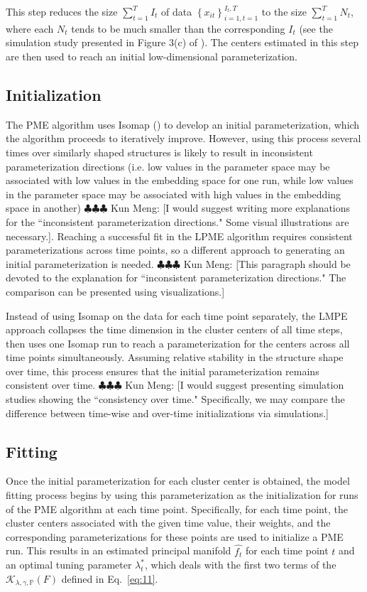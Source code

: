 \documentclass[11pt,reqno]{article}
\newcommand{\meng}[1]{{\color{purple} \sf $\clubsuit\clubsuit\clubsuit$ Kun Meng: [#1]}}
\theoremstyle{definition}
\begin{document}
This step reduces the size $\sum_{t=1}^T I_t$ of data $\left\{x_{it}\right\}_{i=1, t=1}^{I_t, T}$ to the size $\sum_{t=1}^T N_t$, where each $N_t$ tends to be much smaller than the corresponding $I_t$ (see the simulation study presented in Figure 3(c) of \cite{mengPrincipalManifoldEstimation2021}). The centers estimated in this step are then used to reach an initial low-dimensional parameterization.

\subsection*{Initialization}
The PME algorithm uses Isomap (\cite{tenenbaumGlobalGeometricFramework2000}) to develop an initial parameterization, which the algorithm proceeds to iteratively improve. However, using this process several times over similarly shaped structures is likely to result in inconsistent parameterization directions (i.e. low values in the parameter space may be associated with low values in the embedding space for one run, while low values in the parameter space may be associated with high values in the embedding space in another) \meng{I would suggest writing more explanations for the ``inconsistent parameterization directions." Some visual illustrations are necessary.}. Reaching a successful fit in the LPME algorithm requires consistent parameterizations across time points, so a different approach to generating an initial parameterization is needed. \meng{This paragraph should be devoted to the explanation for ``inconsistent parameterization directions." The comparison can be presented using visualizations.}

Instead of using Isomap on the data for each time point separately, the LMPE approach collapses the time dimension in the cluster centers of all time steps, then uses one Isomap run to reach a parameterization for the centers across all time points simultaneously. Assuming relative stability in the structure shape over time, this process ensures that the initial parameterization remains consistent over time. \meng{I would suggest presenting simulation studies showing the ``consistency over time." Specifically, we may compare the difference between time-wise and over-time initializations via simulations.}

\subsection*{Fitting}
Once the initial parameterization for each cluster center is obtained, the model fitting process begins by using this parameterization as the initialization for runs of the PME algorithm at each time point. Specifically, for each time point, the cluster centers associated with the given time value, their weights, and the corresponding parameterizations for these points are used to initialize a PME run. This results in an estimated principal manifold $\widehat{f_t}$ for each time point $t$ and an optimal tuning parameter $\lambda_t^*$, which deals with the first two terms of the $\mathcal{K}_{\lambda, \gamma, \mathbb{P}}(F)$ defined in Eq.~\eqref{eq:11}.
\end{document}
